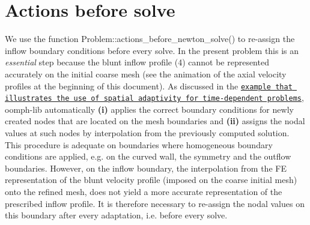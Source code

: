  

\hypertarget{index_before_solve}{}\section{Actions before solve}\label{index_before_solve}
We use the function {\ttfamily Problem\+::actions\+\_\+before\+\_\+newton\+\_\+solve()} to re-\/assign the inflow boundary conditions before every solve. In the present problem this is an {\itshape essential} step because the blunt inflow profile (4) cannot be represented accurately on the initial coarse mesh (see the animation of the axial velocity profiles at the beginning of this document). As discussed in the \href{../../../unsteady_heat/two_d_unsteady_heat_adapt/html/index.html}{\tt example that illustrates the use of spatial adaptivity for time-\/dependent problems}, {\ttfamily oomph-\/lib} automatically {\bfseries (i)} applies the correct boundary conditions for newly created nodes that are located on the mesh boundaries and {\bfseries (ii)} assigns the nodal values at such nodes by interpolation from the previously computed solution. This procedure is adequate on boundaries where homogeneous boundary conditions are applied, e.\+g. on the curved wall, the symmetry and the outflow boundaries. However, on the inflow boundary, the interpolation from the FE representation of the blunt velocity profile (imposed on the coarse initial mesh) onto the refined mesh, does not yield a more accurate representation of the prescribed inflow profile. It is therefore necessary to re-\/assign the nodal values on this boundary after every adaptation, i.\+e. before every solve.


